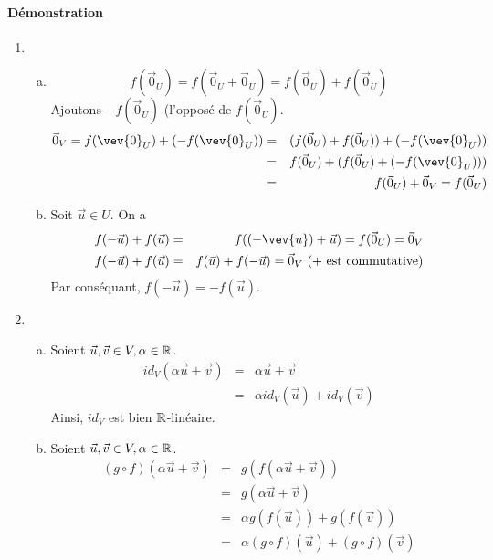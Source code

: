 \paragraph{Démonstration}
\begin{enumerate}
  \item
    \begin{enumerate}[a)]
      \item $$f(\vec{0}_U) = f(\vec{0}_U + \vec{0}_U) = f(\vec{0}_U) + f(\vec{0}_U)$$
        Ajoutons $-f(\vec{0}_U)$ (l'opposé de $f(\vec{0}_U)$.
        \begin{eqnarray*}
          \vec{0}_V = f(\vev{0}_U) + (-f(\vev{0}_U)) &=& (f(\vec{0}_U) + f(\vec{0}_U)) + (-f(\vev{0}_U)) \\
            &=& f(\vec{0}_U) + (f(\vec{0}_U) + (-f(\vev{0}_U))) \\
            &=& f(\vec{0}_U) + \vec{0}_V = f(\vec{0}_U)
        \end{eqnarray*}
      \item Soit $\vec{u} \in U$. On a
        \begin{eqnarray*}
          f(-\vec{u}) + f(\vec{u}) &=& f((-\vev{u}) + \vec{u}) = f(\vec{0}_U) = \vec{0}_V \\
          f(-\vec{u}) + f(\vec{u}) &=& f(\vec{u}) + f(-\vec{u}) = \vec{0}_V ~ \text{(+ est commutative)}
        \end{eqnarray*}
        Par conséquant, $f(-\vec{u}) = -f(\vec{u})$.
    \end{enumerate}
  \item
    \begin{enumerate}[a)]
      \item Soient $\vec{u}, \vec{v} \in V, \alpha \in \mathbb{R}$.
        \begin{eqnarray*}
          id_V(\alpha \vec{u} + \vec{v}) &=& \alpha \vec{u} + \vec{v} \\
            &=& \alpha id_V(\vec{u}) + id_V(\vec{v})
        \end{eqnarray*}$
$Ainsi, $id_V$ est bien $\mathbb{R}$-linéaire.
      \item Soient $\vec{u}, \vec{v} \in V, \alpha \in \mathbb{R}$.
        \begin{eqnarray*}
          (g \circ f)(\alpha \vec{u} +\vec{v}) &=& g(f(\alpha \vec{u} +\vec{v})) \\
            &=& g(\alpha \vec{u} + \vec{v}) \\
            &=& \alpha g(f(\vec{u})) + g(f(\vec{v})) \\
            &=& \alpha (g \circ f)(\vec{u}) + (g \circ f)(\vec{v})
        \end{eqnarray*}
    \end{enumerate}
\end{enumerate}

